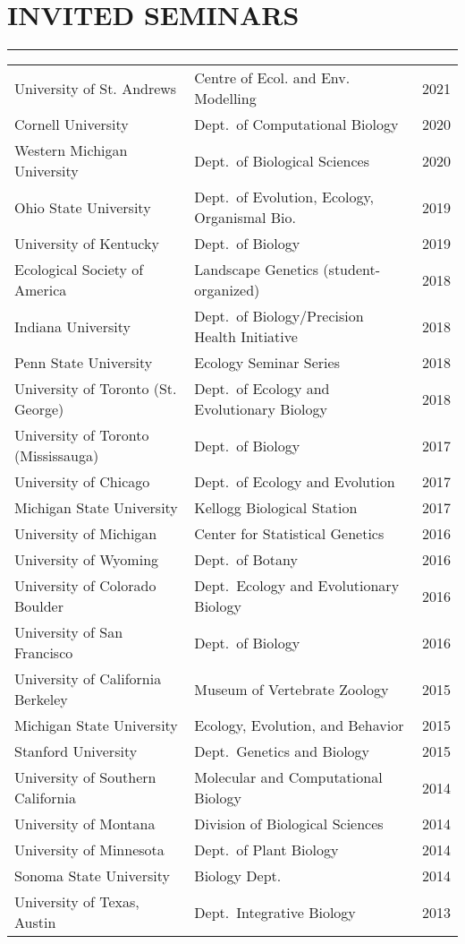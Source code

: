 \documentclass{article}
\begin{document}
\section*{INVITED SEMINARS}
\vspace{-0.6cm}
\rule{470pt}{0.4pt}
%
\begin{longtable}{>{\everypar{\hangindent1cm}}p{}p{}p{}}
%
%
University of St. Andrews & Centre of Ecol. and Env. Modelling & \hfill 2021 \\
%
Cornell University & Dept.\ of Computational Biology & \hfill 2020 \\
%
Western Michigan University & Dept.\ of Biological Sciences & \hfill 2020 \\
%
Ohio State University & Dept.\ of Evolution, Ecology, Organismal Bio. & \hfill 2019 \\
%
University of Kentucky & Dept.\ of Biology & \hfill 2019 \\
%
Ecological Society of America & Landscape Genetics (student-organized) & \hfill 2018 \\
%
Indiana University & Dept.\ of Biology/Precision Health Initiative & \hfill 2018 \\
%
Penn State University & Ecology Seminar Series & \hfill 2018 \\
%
University of Toronto (St. George) & Dept.\ of Ecology and Evolutionary Biology & \hfill 2018 \\
%
University of Toronto (Mississauga) & Dept.\ of Biology & \hfill 2017 \\
%
University of Chicago & Dept.\ of Ecology and Evolution & \hfill 2017 \\
%
Michigan State University & Kellogg Biological Station & \hfill 2017 \\
%
University of Michigan & Center for Statistical Genetics & \hfill 2016 \\
%
University of Wyoming & Dept.\ of Botany & \hfill 2016 \\
%
University of Colorado Boulder & Dept.\ Ecology and Evolutionary Biology & \hfill 2016 \\
%
University of San Francisco & Dept.\ of Biology & \hfill 2016 \\
%
University of California Berkeley & Museum of Vertebrate Zoology & \hfill 2015 \\
%
Michigan State University & Ecology, Evolution, and Behavior & \hfill 2015 \\
%
Stanford University & Dept.\ Genetics and Biology & \hfill 2015 \\
%
University of Southern California & Molecular and Computational Biology & \hfill 2014 \\
%
University of Montana & Division of Biological Sciences & \hfill 2014 \\
%
University of Minnesota & Dept.\ of Plant Biology & \hfill 2014 \\
%
Sonoma State University & Biology Dept.\ & \hfill 2014 \\
%
University of Texas, Austin & Dept.\ Integrative Biology & \hfill 2013 \\
%
\end{longtable}
%
\end{document}
